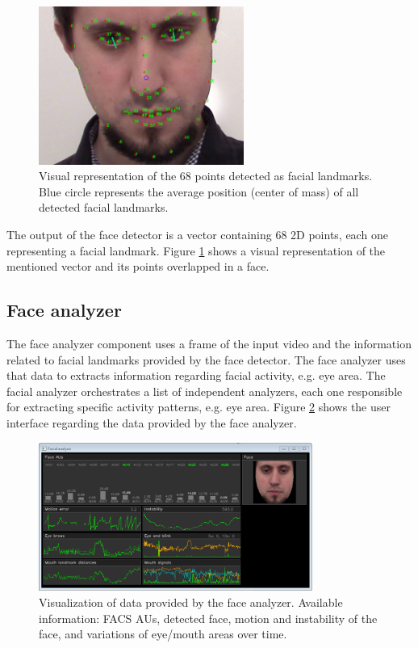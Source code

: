 \begin{figure}
    \centering
    \includegraphics[width=0.6\textwidth]{Content/figures/tool-ui-face-detector.png}
    \caption{Visual representation of the 68 points detected as facial landmarks. Blue circle represents the average position (center of mass) of all detected facial landmarks.}
    \label{fig:tool-ui-face-detector}
\end{figure}

The output of the face detector is a vector containing 68 2D points, each one representing a facial landmark. Figure \ref{fig:tool-ui-face-detector} shows a visual representation of the mentioned vector and its points overlapped in a face.

\subsection{Face analyzer}

The face analyzer component uses a frame of the input video and the information related to facial landmarks provided by the face detector. The face analyzer uses that data to extracts information regarding facial activity, e.g. eye area. The facial analyzer orchestrates a list of independent analyzers, each one responsible for extracting specific activity patterns, e.g. eye area. Figure \ref{fig:tool-ui-face-analyzer} shows the user interface regarding the data provided by the face analyzer.

\begin{figure}[h]
    \centering
    \includegraphics[width=0.8\textwidth]{Content/figures/tool-ui-face-analyzer.png}
    \caption{Visualization of data provided by the face analyzer. Available information: FACS AUs, detected face, motion and instability of the face, and variations of eye/mouth areas over time.}
    \label{fig:tool-ui-face-analyzer}
\end{figure}

